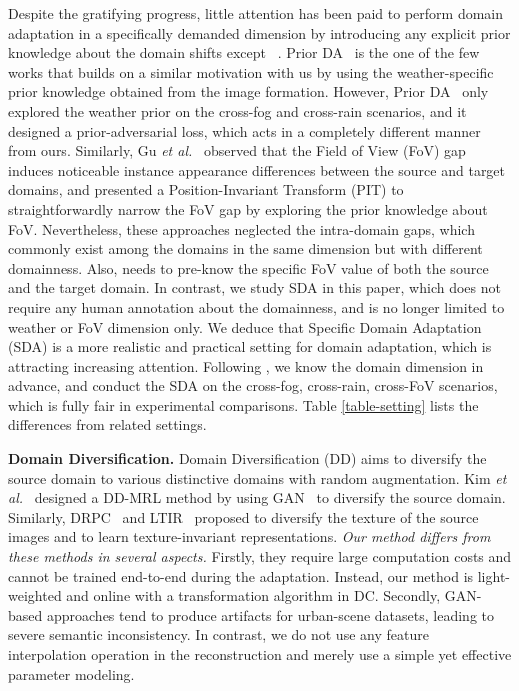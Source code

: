 \documentclass[10pt,journal,compsoc]{IEEEtran}
\begin{document}
Despite the gratifying progress, little attention has been paid to perform domain adaptation in a specifically demanded  dimension by introducing any explicit prior knowledge about the domain shifts except ~\cite{sindagi2019prior,PIT}. Prior DA~\cite{sindagi2019prior} is the one of the few works that builds on a similar motivation with us by using the weather-specific prior knowledge obtained from the image formation. However, Prior DA~\cite{sindagi2019prior} only explored the weather prior on the cross-fog and cross-rain scenarios, and it designed a prior-adversarial loss, which acts in a completely different manner from ours. Similarly, Gu \emph{et al.}~\cite{PIT} observed that the Field of View (FoV) gap induces noticeable instance appearance differences between the source and target domains, and presented a Position-Invariant Transform (PIT) to straightforwardly narrow the FoV gap by exploring the prior knowledge about FoV. Nevertheless, these approaches neglected the intra-domain gaps, which commonly exist among the domains in the same dimension but with different domainness. Also, \cite{PIT} needs to pre-know the specific FoV value of both the source and the target domain. In contrast, we study SDA in this paper, which does not require any human annotation about the domainness, and is no longer limited to weather or FoV dimension only.
We deduce that Specific Domain Adaptation (SDA) is a more realistic and practical setting for domain adaptation, which is attracting increasing attention. Following  \cite{sindagi2019prior,PIT}, we know the domain dimension in advance, and conduct the SDA on the cross-fog, cross-rain, cross-FoV scenarios, which is fully fair in experimental comparisons. Table \ref{table-setting} lists the differences from related settings.


\noindent \textbf{Domain Diversification.} Domain Diversification (DD) aims to diversify the source domain to various distinctive domains with random augmentation. Kim \emph{et al.}~\cite{DDMRL} designed a DD-MRL method by using GAN~\cite{GAN} to diversify the source domain. Similarly, DRPC~\cite{DRPC} and LTIR~\cite{LTIR} proposed to diversify the texture of the source images and to learn texture-invariant representations. 
\textit{Our method differs from these methods in several aspects.}  Firstly, they require large computation costs and cannot be trained end-to-end during the adaptation.  Instead, our method is light-weighted and online with a transformation algorithm in DC. Secondly, GAN-based approaches tend to produce artifacts for urban-scene datasets, leading to severe semantic inconsistency. In contrast, we do not use any feature interpolation operation in the reconstruction and merely use a simple yet effective parameter modeling.
\end{document}
